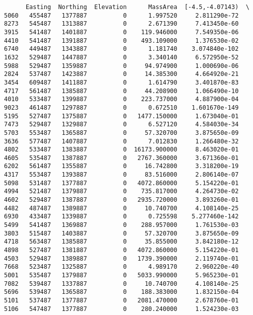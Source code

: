\documentclass[11pt]{article}
\begin{document}
    
    \begin{verbatim}
      Easting  Northing  Elevation      MassArea  [-4.5,-4.07143)  \
5060   455487   1377887          0      1.997520     2.811290e-72   
8273   545487   1313887          0      2.671390     7.413450e-60   
3915   541487   1401887          0    119.946000     7.549350e-06   
4410   541487   1391887          0    493.109000     1.376530e-02   
6740   449487   1343887          0      1.181740    3.074840e-102   
1632   529487   1447887          0      3.340140     6.572950e-52   
5988   529487   1359887          0     94.974900     1.000690e-06   
2824   537487   1423887          0     14.385300     4.664920e-21   
3454   609487   1411887          0      1.614790     3.401870e-83   
4717   561487   1385887          0     44.208900     1.066490e-10   
4010   533487   1399887          0    223.737000     4.887900e-04   
9023   461487   1297887          0      0.672510    1.601670e-149   
5195   527487   1375887          0   1477.150000     1.673040e-01   
7473   529487   1329887          0      6.527120     4.584030e-34   
5703   553487   1365887          0     57.320700     3.875650e-09   
3636   577487   1407887          0      7.012830     1.266480e-32   
4802   533487   1383887          0  16173.900000     8.463020e-01   
4605   535487   1387887          0   2767.360000     3.671360e-01   
6202   561487   1355887          0     16.742800     3.318200e-19   
4317   553487   1393887          0     83.516000     2.806140e-07   
5098   531487   1377887          0   4072.860000     5.154220e-01   
4994   521487   1379887          0    735.817000     4.264730e-02   
4602   529487   1387887          0   2935.720000     3.893260e-01   
4482   487487   1389887          0     10.740700     4.108140e-25   
6930   433487   1339887          0      0.725598    5.277460e-142   
5499   541487   1369887          0    288.957000     1.761530e-03   
3803   515487   1403887          0     57.320700     3.875650e-09   
4718   563487   1385887          0     35.855000     3.842180e-12   
4898   527487   1381887          0   4072.860000     5.154220e-01   
4503   529487   1389887          0   1739.390000     2.119740e-01   
7668   523487   1325887          0      4.989170     2.960220e-40   
5001   535487   1379887          0   5033.990000     5.965230e-01   
7082   539487   1337887          0     10.740700     4.108140e-25   
5696   539487   1365887          0    188.383000     1.832150e-04   
5101   537487   1377887          0   2081.470000     2.678760e-01   
5106   547487   1377887          0    280.240000     1.524230e-03   

\end{verbatim}
\end{document}
